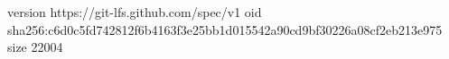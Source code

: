 version https://git-lfs.github.com/spec/v1
oid sha256:c6d0c5fd742812f6b4163f3e25bb1d015542a90cd9bf30226a08cf2eb213e975
size 22004
